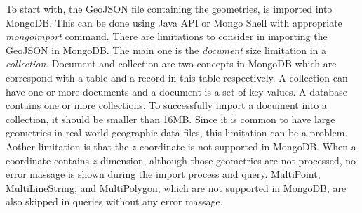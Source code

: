 \documentclass[a4paper,12pt]{article}
\begin{document}
To start with, the GeoJSON file containing the geometries, is imported into MongoDB. This can be done  using Java API or Mongo Shell with appropriate \textit{mongoimport} command. There are limitations to consider in importing the GeoJSON in MongoDB. The main one is the \textit{document} size limitation in a \textit{collection}. Document and collection are two concepts in MongoDB which are correspond with a table and a record in this table respectively. A collection can have one or more documents and a document is a set of key-values. A database contains one or more collections. To successfully import a document into a collection, it should be smaller than 16MB. Since it is common to have large geometries in real-world geographic data files, this limitation can be a problem. Aother limitation is that the $z$ coordinate is not supported in MongoDB. When a coordinate contains $z$ dimension, although those geometries are not processed, no error massage is shown during the import process and query. MultiPoint, MultiLineString, and MultiPolygon, which are not supported in MongoDB, are also skipped in queries without any error massage. 
\end{document}

